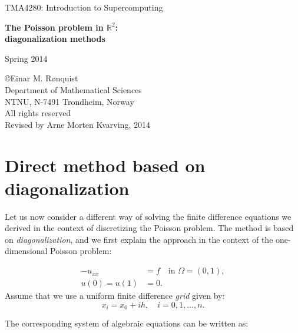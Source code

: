 \documentclass[11pt]{article}
\begin{document}
 
\LARGE
\begin{center}
TMA4280: Introduction to Supercomputing
\end{center}
\vspace{1in}

\begin{center}
{\bf The Poisson problem in $\mathbb{R}^2$: \\
diagonalization methods}
\end{center}

\Large
\vspace{0.5in}
\begin{center}
Spring 2014
\end{center}

\vspace{0.5in}

\begin{center}
\copyright Einar M. R{\o}nquist \\
Department of Mathematical Sciences\\
NTNU, N-7491 Trondheim, Norway\\
All rights reserved \\
Revised by Arne Morten Kvarving, 2014
\end{center}

\large

\newpage

\section{Direct method based on diagonalization}
Let us now consider a different way of solving the finite difference equations
we derived in the context of discretizing the Poisson problem. 
The method is based on {\em diagonalization}, and we first explain the approach 
in the context of the one-dimensional Poisson problem:

\begin{align*}
  -u_{xx} &= f \quad \text{in } \Omega = (0,1), \\
  u(0) = u(1) &= 0.
\end{align*}
Assume that we use a uniform finite difference {\em grid} given by:
\begin{equation*}
  x_i = x_0 + ih, \quad i=0,1,\ldots,n.
\end{equation*}

The corresponding system of algebraic equations can be written as:
\end{document}
